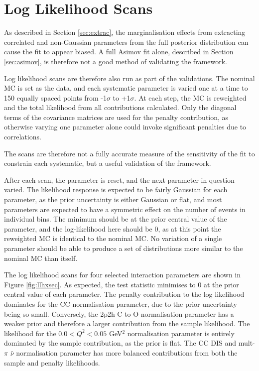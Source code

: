 \section{Log Likelihood Scans}\label{sec:llhscan}

As described in Section \ref{sec:extrac}, the marginalisation effects from extracting correlated and non-Gaussian parameters from the full posterior distribution can cause the fit to appear biased. A full Asimov fit alone, described in Section \ref{sec:asimov}, is therefore not a good method of validating the framework. 

Log likelihood scans are therefore also run as part of the validations. The nominal MC is set as the data, and each systematic parameter is varied one at a time to 150 equally spaced points from -1$\sigma$ to +1$\sigma$. At each step, the MC is reweighted and the total likelihood from all contributions calculated. Only the diagonal terms of the covariance matrices are used for the penalty contribution, as otherwise varying one parameter alone could invoke significant penalties due to correlations. 

The scans are therefore not a fully accurate measure of the sensitivity of the fit to constrain each systematic, but a useful validation of the framework.

After each scan, the parameter is reset, and the next parameter in question varied. The likelihood response is expected to be fairly Gaussian for each parameter, as the prior uncertainty is either Gaussian or flat, and most parameters are expected to have a symmetric effect on the number of events in individual bins. The minimum should be at the prior central value of the parameter, and the log-likelihood here should be 0, as at this point the reweighted MC is identical to the nominal MC. No variation of a single parameter should be able to produce a set of distributions more similar to the nominal MC than itself.

The log likelihood scans for four selected interaction parameters are shown in Figure \ref{fig:llhxsec}. As expected, the test statistic minimises to 0 at the prior central value of each parameter. The penalty contribution to the log likelihood dominates for the CC normalisation parameter, due to the prior uncertainty being so small. Conversely, the 2p2h C to O normalisation parameter has a weaker prior and therefore a larger contribution from the sample likelihood. The likelihood for the $0.0 < Q^2 < 0.05$ GeV$^2$ normalisation parameter is entirely dominated by the sample contribution, as the prior is flat. The CC DIS and mult-$\pi$ $\bar{\nu}$ normalisation parameter has more balanced contributions from both the sample and penalty likelihoods.

